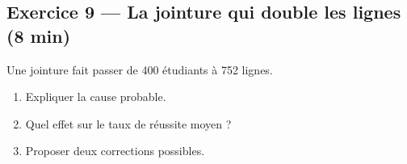 \subsection*{Exercice 9 --- La jointure qui double les lignes \hfill \normalfont\footnotesize (8 min)}
Une jointure fait passer de 400 étudiants à 752 lignes.
\begin{enumerate}
  \item Expliquer la cause probable.
  \item Quel effet sur le taux de réussite moyen ?
  \item Proposer deux corrections possibles.
\end{enumerate}

\newpage
